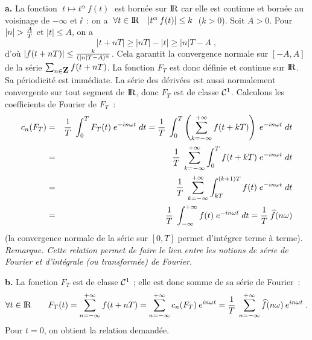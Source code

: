 \documentclass{article}
\begin{document}
\msk
\cl{- - - - - - - - - - - - - - - - - - - - - - - - - - - - - -}
\msk


{\bf a.} La fonction $\;t\mapsto t^{\alpha}\>f(t)\;$ est born\'ee sur ${\rm I\kern-0.6mm R}$
car elle est continue et born\'ee au voisinage de $-\infty$ et $\ii$~: on a
$\;\forall t\in{\rm I\kern-0.6mm R}\quad|t^{\alpha}\>f(t)|\le k\;$ ($k>0$).\pn
Soit $A>0$. Pour $|n|>{A\s T}$ et $|t|\le A$, on a\vv
$$|t+nT|\ge|nT|-|t|\ge|n|T-A\;,$$
d'o\`u $|f(t+nT)|\le{k\over(|n|T-A)^{\alpha}}$. Cela garantit la convergence
normale sur $[-A,A]$ de la s\'erie $\sum_{n\in\zmat}f(t+nT)$. La fonction
$F_T$ est donc d\'efinie et continue sur ${\rm I\kern-0.6mm R}$. Sa p\'eriodicit\'e est
imm\'ediate.\pn
La s\'erie des d\'eriv\'ees est aussi normalement convergente sur tout segment
de ${\rm I\kern-0.6mm R}$, donc $F_T$ est de classe ${\cal C}^1$.\psn
Calculons les coefficients de Fourier de $F_T$~:\vv
\begin{eqnarray*}
c_n(F_T) & = & {1\over T}\;\int_0^TF_T(t)\;e^{-in\omega t}\;dt
                      ={1\over T}\;\int_0^T\left(\sum_{k=-\infty}^{+\infty}
                           f(t+kT)\right)\;e^{-in\omega t}\;dt\\
                    & = & {1\over T}\;\sum_{k=-\infty}^{+\infty}\int_0^Tf(t+kT)\;
                           e^{-in\omega t}\;dt\\
                    & = & {1\over T}\;\sum_{k=-\infty}^{+\infty}\int_{kT}^{(k+1)T}
                           f(t)\;e^{-in\omega t}\;dt\\
                    & = & {1\over T}\;\int_{-\infty}^{+\infty}f(t)\;
                           e^{-in\omega t}\;dt
                      ={1\over T}\>\widehat{f}(n\omega)
\end{eqnarray*}
(la convergence normale de la s\'erie sur $[0,T]$ permet d'int\'egrer terme
\`a terme).\msk\sect
{\it Remarque. Cette relation permet de faire le lien entre les notions
de s\'erie de Fourier et d'int\'egrale (ou transform\'ee) de Fourier.}

\msk
{\bf b.} La fonction $F_T$ est de classe ${\cal C}^1$ ; elle est donc somme
de sa s\'erie de Fourier~:\vv
$$\forall t\in{\rm I\kern-0.6mm R}\qquad F_T(t)=\sum_{n=-\infty}^{+\infty}f(t+nT)=\sum_{n=-\infty}
  ^{+\infty}c_n(F_T)\>e^{in\omega t}={1\over T}\>\sum_{n=-\infty}^{+\infty}
  \widehat{f}(n\omega)\>e^{in\omega t}\;.$$
Pour $t=0$, on obtient la relation demand\'ee.
\end{document}
